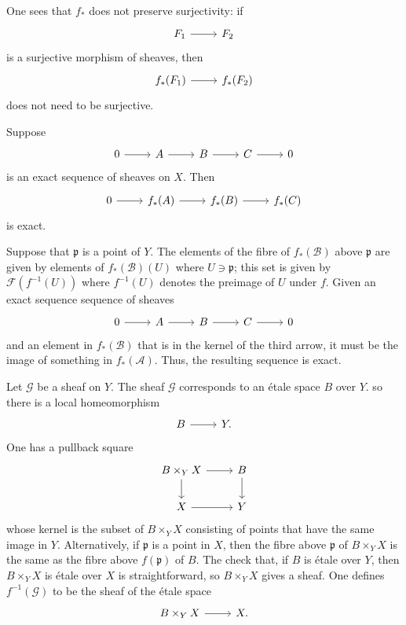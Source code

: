 \documentclass [11 pt, oneside] {article}
\begin{document}
One sees that $f_*$ does not preserve surjectivity: if 
\[
\begin{tikzcd}
\mathscr{F}_1\ar[r]& \mathscr{F}_2
\end{tikzcd}
\]
is a surjective morphism of sheaves, then 
\[
\begin{tikzcd}
f_*(\mathscr{F}_1)\ar[r]& f_*(\mathscr{F}_2)
\end{tikzcd}
\]
does not need to be surjective.

Suppose
\[
\begin{tikzcd}
	0 \ar[r] &\mathscr{A} \ar[r] &\mathscr{B} \ar[r] &\mathscr{C}\ar[r]&0
\end{tikzcd}
\]
is an exact sequence of sheaves on $X$. Then
\[
\begin{tikzcd}
	0 \ar[r]&f_*(\mathscr{A}) \ar[r] &f_*(\mathscr{B}) \ar[r] &f_*(\mathscr{C})
\end{tikzcd}
\]
is exact. 

Suppose that $\mathfrak p$ is a point of $Y$. The elements of the fibre of $f_*(\mathscr{B})$ above $\mathfrak p$ are given by elements of $f_*(\mathscr{B})(U)$ where $U\ni \mathfrak p$; this set is given by $\mathscr{F}(f^{-1}(U))$ where $f^{-1}(U)$ denotes the preimage of $U$ under $f$. Given an exact sequence sequence of sheaves
\[
\begin{tikzcd}
	 0 \ar[r] &\mathscr{A} \ar[r] &\mathscr{B} \ar[r] &\mathscr{C}\ar[r]&0
\end{tikzcd}
\]
and an element in $f_*(\mathscr{B})$ that is in the kernel of the third arrow, it must be the image of something in $f_*(\mathscr{A})$. Thus, the resulting sequence is exact.

Let $\mathscr{G}$ be a sheaf on $Y$. The sheaf $\mathscr{G}$ corresponds to an \'etale space $B$ over $Y$. so there is a local homeomorphism 
\[
\begin{tikzcd}
B\ar[r]&Y.
\end{tikzcd}
\]
One has a pullback square
\[
\begin{tikzcd}
	B\times_Y X \ar[r] \ar[d] & B\ar[d]\\
	X \ar[r] & Y
\end{tikzcd}
\]
whose kernel is the subset of $B\times_Y X$ consisting of points that have the same image in $Y$. Alternatively, if $\mathfrak p$ is a point in $X$, then the fibre above $\mathfrak p$ of $B\times_Y X$ is the same as the fibre above $f(\mathfrak p)$ of $B$. The check that, if $B$ is \'etale over $Y$, then $B\times_Y X$ is \'etale over $X$ is straightforward, so $B\times_Y X$ gives a sheaf. One defines $f^{-1}(\mathscr{G})$ to be the sheaf of the \'etale space 
\[
\begin{tikzcd}
B\times_Y X\ar[r]&X.
\end{tikzcd}
\]
\end{document}
